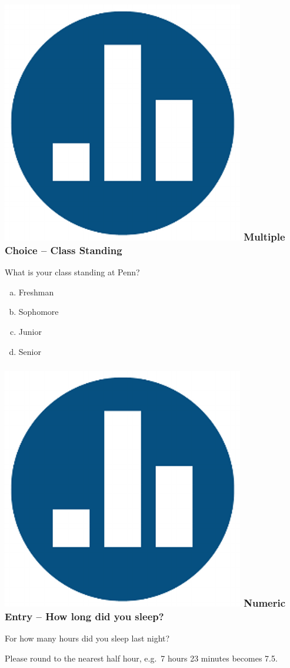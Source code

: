 \begin{frame}
  \frametitle{\includegraphics[scale = 0.05]{./images/clicker} \hfill Multiple Choice -- Class Standing} 
  What is your class standing at Penn?
  \begin{enumerate}[(a)]
    \item Freshman
    \item Sophomore
    \item Junior
    \item Senior
  \end{enumerate}
\end{frame}
\begin{frame}
  \frametitle{\includegraphics[scale = 0.05]{./images/clicker} \hfill Numeric Entry -- How long did you sleep?} 
  For how many hours did you sleep last night? 
  \vspace{1em}

  Please round to the nearest half hour, e.g.\ 7 hours 23 minutes becomes 7.5.
\end{frame}


